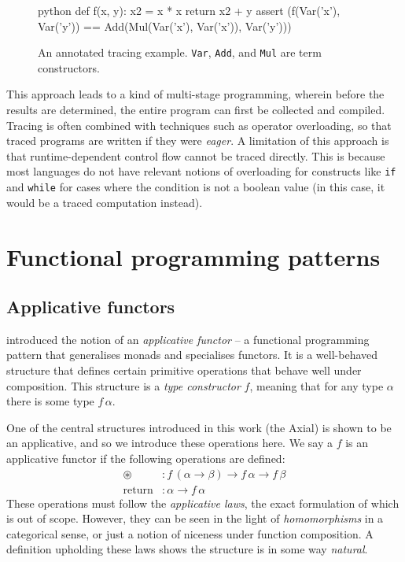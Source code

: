 \begin{figure}[ht]
    \centering
    \begin{cminted}{python}
def f(x, y):
    x2 = x * x
    return x2 + y
assert (f(Var('x'), Var('y')) 
        == Add(Mul(Var('x'), Var('x')), Var('y')))
    \end{cminted}
    \caption{An annotated tracing example. \texttt{Var}, \texttt{Add}, and \texttt{Mul} are term constructors.}
    \label{fig:tracing}
\end{figure}

This approach leads to a kind of multi-stage programming, wherein before the results are determined, the entire program can first be collected and compiled. Tracing is often combined with techniques such as operator overloading, so that traced programs are written if they were \textit{eager}. A limitation of this approach is that runtime-dependent control flow cannot be traced directly. This is because most languages do not have relevant notions of overloading for constructs like \texttt{if} and \texttt{while} for cases where the condition is not a boolean value (in this case, it would be a traced computation instead).

\section{Functional programming patterns}
\label{functional-programming-patterns}

\subsection{Applicative functors}

\textcite{mcbride2008applicative} introduced the notion of an \textit{applicative functor} -- a functional programming pattern that generalises monads and specialises functors. It is a well-behaved structure that defines certain primitive operations that behave well under composition. This structure is a \textit{type constructor} $f$, meaning that for any type $\alpha$ there is some type $f\,\alpha$.

One of the central structures introduced in this work (the Axial) is shown to be an applicative, and so we introduce these operations here. We say a $f$ is an applicative functor if the following operations are defined:
\begin{align*}
\circledast &: f\,(\alpha \to \beta) \to f\,\alpha \to f\,\beta \\
\mathrm{return} &: \alpha \to f\,\alpha
\end{align*}
These operations must follow the \textit{applicative laws}, the exact formulation of which is out of scope. However, they can be seen in the light of \textit{homomorphisms} in a categorical sense, or just a notion of niceness under function composition. A definition upholding these laws shows the structure is in some way \textit{natural}. 

